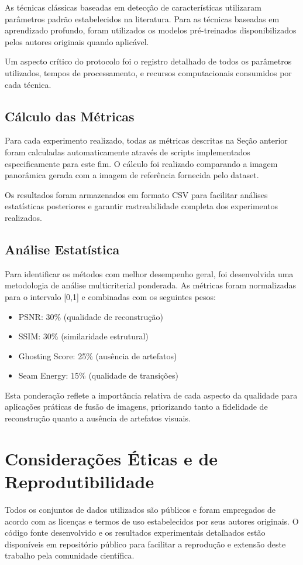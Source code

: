 As técnicas clássicas baseadas em detecção de características utilizaram parâmetros padrão estabelecidos na literatura. Para as técnicas baseadas em aprendizado profundo, foram utilizados os modelos pré-treinados disponibilizados pelos autores originais quando aplicável.

Um aspecto crítico do protocolo foi o registro detalhado de todos os parâmetros utilizados, tempos de processamento, e recursos computacionais consumidos por cada técnica.

\subsection{Cálculo das Métricas}

Para cada experimento realizado, todas as métricas descritas na Seção anterior foram calculadas automaticamente através de scripts implementados especificamente para este fim. O cálculo foi realizado comparando a imagem panorâmica gerada com a imagem de referência fornecida pelo dataset.

Os resultados foram armazenados em formato CSV para facilitar análises estatísticas posteriores e garantir rastreabilidade completa dos experimentos realizados.

\subsection{Análise Estatística}

Para identificar os métodos com melhor desempenho geral, foi desenvolvida uma metodologia de análise multicriterial ponderada. As métricas foram normalizadas para o intervalo [0,1] e combinadas com os seguintes pesos:

\begin{itemize}
    \item PSNR: 30\% (qualidade de reconstrução)
    \item SSIM: 30\% (similaridade estrutural)
    \item Ghosting Score: 25\% (ausência de artefatos)
    \item Seam Energy: 15\% (qualidade de transições)
\end{itemize}

Esta ponderação reflete a importância relativa de cada aspecto da qualidade para aplicações práticas de fusão de imagens, priorizando tanto a fidelidade de reconstrução quanto a ausência de artefatos visuais.

\section{Considerações Éticas e de Reprodutibilidade}

Todos os conjuntos de dados utilizados são públicos e foram empregados de acordo com as licenças e termos de uso estabelecidos por seus autores originais. O código fonte desenvolvido e os resultados experimentais detalhados estão disponíveis em repositório público para facilitar a reprodução e extensão deste trabalho pela comunidade científica.
